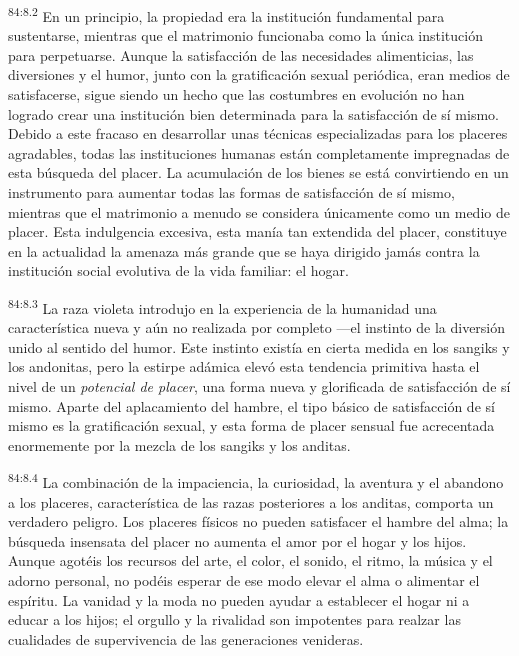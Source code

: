\par
\textsuperscript{84:8.2} En un principio, la propiedad era la institución fundamental para sustentarse, mientras que el matrimonio funcionaba como la única institución para perpetuarse. Aunque la satisfacción de las necesidades alimenticias, las diversiones y el humor, junto con la gratificación sexual periódica, eran medios de satisfacerse, sigue siendo un hecho que las costumbres en evolución no han logrado crear una institución bien determinada para la satisfacción de sí mismo. Debido a este fracaso en desarrollar unas técnicas especializadas para los placeres agradables, todas las instituciones humanas están completamente impregnadas de esta búsqueda del placer. La acumulación de los bienes se está convirtiendo en un instrumento para aumentar todas las formas de satisfacción de sí mismo, mientras que el matrimonio a menudo se considera únicamente como un medio de placer. Esta indulgencia excesiva, esta manía tan extendida del placer, constituye en la actualidad la amenaza más grande que se haya dirigido jamás contra la institución social evolutiva de la vida familiar: el hogar.

\par
\textsuperscript{84:8.3} La raza violeta introdujo en la experiencia de la humanidad una característica nueva y aún no realizada por completo ---el instinto de la diversión unido al sentido del humor. Este instinto existía en cierta medida en los sangiks y los andonitas, pero la estirpe adámica elevó esta tendencia primitiva hasta el nivel de un \textit{potencial de placer}, una forma nueva y glorificada de satisfacción de sí mismo. Aparte del aplacamiento del hambre, el tipo básico de satisfacción de sí mismo es la gratificación sexual, y esta forma de placer sensual fue acrecentada enormemente por la mezcla de los sangiks y los anditas.

\par
\textsuperscript{84:8.4} La combinación de la impaciencia, la curiosidad, la aventura y el abandono a los placeres, característica de las razas posteriores a los anditas, comporta un verdadero peligro. Los placeres físicos no pueden satisfacer el hambre del alma; la búsqueda insensata del placer no aumenta el amor por el hogar y los hijos. Aunque agotéis los recursos del arte, el color, el sonido, el ritmo, la música y el adorno personal, no podéis esperar de ese modo elevar el alma o alimentar el espíritu. La vanidad y la moda no pueden ayudar a establecer el hogar ni a educar a los hijos; el orgullo y la rivalidad son impotentes para realzar las cualidades de supervivencia de las generaciones venideras.

